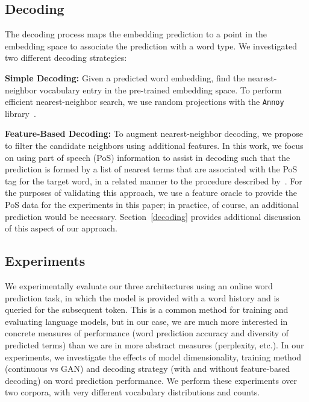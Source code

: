 \documentclass[11pt,a4paper]{article}
\begin{document}
\subsection{Decoding}\label{subsec:dec}
The decoding process maps the embedding prediction to a point in the embedding space to associate the prediction with a word type. We investigated two different decoding strategies:

\noindent
\textbf{Simple Decoding:} Given a predicted word embedding, find the nearest-neighbor vocabulary entry in the pre-trained embedding space. To perform efficient nearest-neighbor search, we use random projections with the \texttt{Annoy} library~\citep{Bernhardsson:2018aa}.


\noindent
\textbf{Feature-Based Decoding:} To augment nearest-neighbor decoding, we propose to filter the candidate neighbors using additional features.
In this work, we focus on using part of speech (PoS) information to assist in decoding such that the prediction is formed by a list of nearest terms that are associated with the PoS tag for the target word, in a related manner to the procedure described by~\citet{czarnowska2019don}. 
For the purposes of validating this approach, we use a feature oracle to provide the PoS data for the experiments in this paper; in practice, of course, an additional prediction would be necessary. 
Section~\ref{decoding} provides additional discussion of this aspect of our approach.

\subsection{Experiments}

We experimentally evaluate our three architectures using an online word prediction task, in which the model is provided with a word history and is queried for the subsequent token. 
This is a common method for training and evaluating language models, but in our case, we are much more interested in concrete measures of performance (word prediction accuracy and diversity of predicted terms) than we are in more abstract measures (perplexity, etc.).
In our experiments, we investigate the effects of model dimensionality, training method (continuous vs GAN) and decoding strategy (with and without feature-based decoding) on word prediction performance. 
We perform these experiments over two corpora, with very different vocabulary distributions and counts.
\end{document}

